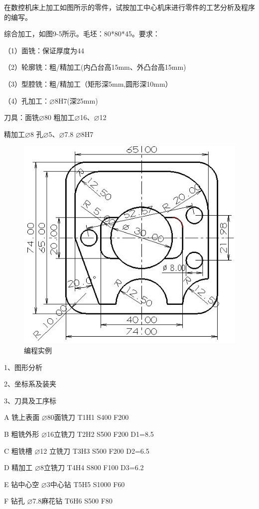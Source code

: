 	在数控机床上加工如图所示的零件，试按加工中心机床进行零件的工艺分析及程序的编写。
	
	综合加工，如图9-5所示。毛坯：80*80*45。要求：
	
	（1）面铣：保证厚度为44 
	     
	（2）轮廓铣：粗/精加工(内凸台高15mm、外凸台高15mm)    
	  
	（3）型腔铣：粗/精加工（矩形深5mm,圆形深10mm） 
	    
	（4）孔加工：$\varnothing $8H7(深25mm)
	
	刀具：面铣$\varnothing $80         粗加工$\varnothing $16、$\varnothing $12   
	   
	精加工$\varnothing $8        孔$\varnothing $5、$\varnothing $7.8   $\varnothing $8H7
	
	\begin{figure}[h]
		\centering
		\includegraphics[width=0.7\linewidth]{data/image/25-1}
		\caption{编程实例}
		\label{fig:25-1}
	\end{figure}
	
	1、图形分析
	
	2、坐标系及装夹
	
	3、刀具及工序标
	
	A 铣上表面  $\varnothing$80面铣刀 T1H1 S400 F200 
	
	B 粗铣外形  $\varnothing$16立铣刀 T2H2 S500 F200 D1=8.5
	
	C 粗铣槽    $\varnothing$12 立铣刀 T3H3 S500 F200 D2=6.5
	
	D 精加工    $\varnothing$8立铣刀  T4H4  S800 F100 D3=6.2
	
	E 钻中心空  $\varnothing$3中心钻   T5H5 S1000 F60
	
	F 钻孔     $\varnothing$7.8麻花钻 T6H6 S500  F80
	
